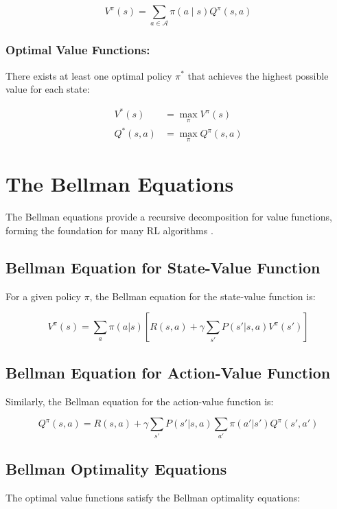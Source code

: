 \documentclass[../Main.tex]{subfiles}
\begin{document}
\begin{equation}
    V^\pi(s) = \sum_{a \in \mathcal{A}} \pi(a \mid s) Q^\pi(s, a)
\end{equation}

\subsubsection{Optimal Value Functions:}
There exists at least one optimal policy $\pi^*$ that achieves the highest possible value for each state:

\begin{align}
    V^*(s) &= \max_\pi V^\pi(s) \\
    Q^*(s, a) &= \max_\pi Q^\pi(s, a)
\end{align}

\section{The Bellman Equations}

The Bellman equations provide a recursive decomposition for value functions, forming the foundation for many RL algorithms \cite{bellman1957dynamic}.

\subsection{Bellman Equation for State-Value Function}
For a given policy $\pi$, the Bellman equation for the state-value function is:

\begin{equation}
    V^{\pi}(s) = \sum_{a} \pi(a|s) \left[ R(s,a) + \gamma \sum_{s'} P(s'|s,a) V^{\pi}(s') \right]
\end{equation}

\subsection{Bellman Equation for Action-Value Function}
Similarly, the Bellman equation for the action-value function is:

\begin{equation}
    Q^{\pi}(s,a) = R(s,a) + \gamma \sum_{s'} P(s'|s,a) \sum_{a'} \pi(a'|s') Q^{\pi}(s',a')
\end{equation}

\subsection{Bellman Optimality Equations}
The optimal value functions satisfy the Bellman optimality equations:
\end{document}
